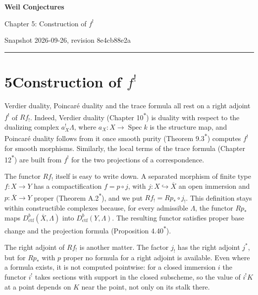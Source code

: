 \documentclass[11pt]{article}
\newcommand{\bpout}[1]{#1\textsuperscript{\hyperlink{bp-outside}{\ensuremath{\ast}}}}
\begin{document}
\pagestyle{plain}
\begin{center}
{\LARGE\bfseries Weil Conjectures\par}
\vspace{0.7em}
{\large Chapter 5: Construction of $f^!$\par}
\vspace{0.5em}
{\small\color{bpmuted}Snapshot 2026-09-26, revision 8e4cb88e2a\par}
\end{center}
\vspace{0.5em}
{\small\tableofcontents}
\bigskip\hrule\bigskip

\section*{\texorpdfstring{5\quad Construction of $f^!$}{5 Construction of f!}}
\label{bp1}%
\label{bp2}%
Verdier duality, Poincaré duality and the trace formula all rest on a right adjoint \(f^!\) of \(Rf_!\). Indeed, Verdier duality (Chapter \bpout{10}) is duality with respect to the dualizing complex \(a_X^!\Lambda\), where \(a_X:X\to\operatorname{Spec}k\) is the structure map, and Poincaré duality follows from it once smooth purity (Theorem \bpout{9.3}) computes \(f^!\) for smooth morphisms. Similarly, the local terms of the trace formula (Chapter \bpout{12}) are built from \(f^!\) for the two projections of a correspondence.

The functor \(Rf_!\) itself is easy to write down. A separated morphism of finite type \(f:X\to Y\) has a compactification \(f=p\circ j\), with \(j:X\hookrightarrow\overline X\) an open immersion and \(p:\overline X\to Y\) proper (Theorem \bpout{A.2}), and we put \(Rf_!=Rp_*\circ j_!\). This definition stays within constructible complexes because, for every admissible \(\Lambda\), the functor \(Rp_*\) maps \(D^b_{\mathrm{ctf}}(\overline X,\Lambda)\) into \(D^b_{\mathrm{ctf}}(Y,\Lambda)\). The resulting functor satisfies proper base change and the projection formula (Proposition \bpout{4.40}).

The right adjoint of \(Rf_!\) is another matter. The factor \(j_!\) has the right adjoint \(j^*\), but for \(Rp_*\) with \(p\) proper no formula for a right adjoint is available. Even where a formula exists, it is not computed pointwise: for a closed immersion \(i\) the functor \(i^!\) takes sections with support in the closed subscheme, so the value of \(i^!K\) at a point depends on \(K\) near the point, not only on its stalk there.
\end{document}
